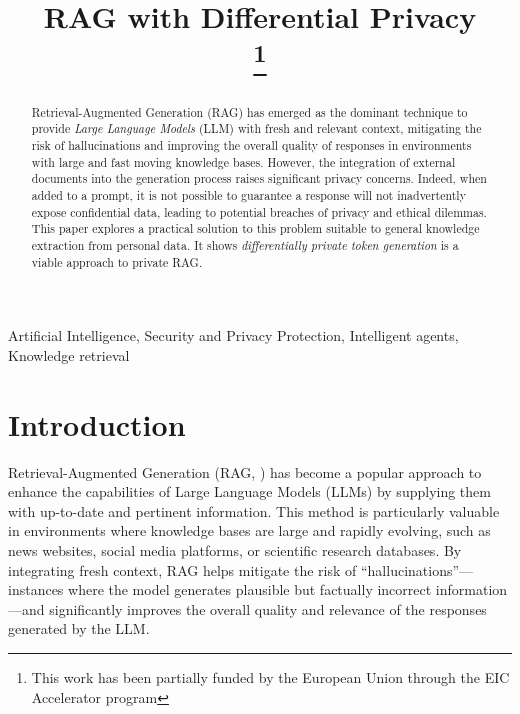 \documentclass[conference]{IEEEtran}
\begin{document}
\title{RAG with Differential Privacy\\
\thanks{This work has been partially funded by the European Union through the EIC Accelerator program}
}

\author{}

\maketitle

\begin{abstract}
Retrieval-Augmented Generation (RAG) has emerged as the dominant
technique to provide \emph{Large Language Models} (LLM) with fresh and
relevant context, mitigating the risk of hallucinations and improving
the overall quality of responses in environments with large and fast
moving knowledge bases. However, the integration of external documents
into the generation process raises significant privacy concerns. Indeed,
when added to a prompt, it is not possible to guarantee a response will
not inadvertently expose confidential data, leading to potential
breaches of privacy and ethical dilemmas. This paper explores a
practical solution to this problem suitable to general knowledge
extraction from personal data. It shows \emph{differentially private
token generation} is a viable approach to private RAG.
\end{abstract}

\begin{IEEEkeywords}
Artificial Intelligence, Security and Privacy Protection, Intelligent agents, Knowledge retrieval
\end{IEEEkeywords}

\section{Introduction}


Retrieval-Augmented Generation (RAG, \cite{ref-lewis2021retrievalaugmentedgenerationknowledgeintensivenlp}) has become a
popular approach to enhance the capabilities of Large Language Models
(LLMs) by supplying them with up-to-date and pertinent information. This
method is particularly valuable in environments where knowledge bases
are large and rapidly evolving, such as news websites, social media
platforms, or scientific research databases. By integrating fresh
context, RAG helps mitigate the risk of ``hallucinations''---instances
where the model generates plausible but factually incorrect
information---and significantly improves the overall quality and
relevance of the responses generated by the LLM.
\end{document}
